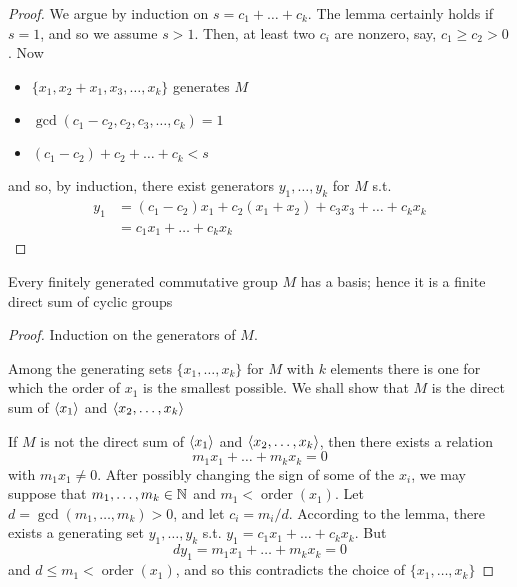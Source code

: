 \documentclass[11pt]{article}
\DeclareMathOperator{\order}{order}
\begin{document}
\begin{proof}
We argue by induction on \(s=c_1+\dots+c_k\). The lemma certainly holds if \(s=1\), and so we
assume \(s>1\). Then, at least two \(c_i\) are nonzero, say, \(c_1\ge c_2>0\). Now
\begin{itemize}
\item \(\{x_1,x_2+x_1,x_3,\dots,x_k\}\) generates \(M\)
\item \(\gcd(c_1-c_2,c_2,c_3,\dots,c_k)=1\)
\item \((c_1-c_2)+c_2+\dots+c_k<s\)
\end{itemize}


and so, by induction, there exist generators \(y_1,\dots,y_k\) for \(M\) s.t.
\begin{align*}
y_1&=(c_1-c_2)x_1+c_2(x_1+x_2)+c_3x_3+\dots+c_kx_k\\
&=c_1x_1+\dots+c_kx_k
\end{align*}
\end{proof}

\begin{theorem}[]
\label{1.54}
Every finitely generated commutative group \(M\) has a basis; hence it is a finite direct sum of
cyclic groups
\end{theorem}

\begin{proof}
Induction on the generators of \(M\).

Among the generating sets \(\{x_1,\dots,x_k\}\) for \(M\) with \(k\) elements there is one for which
the order of \(x_1\) is the smallest possible. We shall show that \(M\) is the direct sum
of \(\langle x_1\rangle\) and \(\langle x_2,\dots,x_k\rangle\)

If \(M\) is not the direct sum of \(\langle x_1\rangle\) and \(\langle x_2,\dots,x_k\rangle\), then there exists a relation
\begin{equation*}
m_1x_1+\dots+m_kx_k=0
\end{equation*}
with \(m_1x_1\neq 0\). After possibly changing the sign of some of the \(x_i\), we may suppose
that \(m_1,\dots,m_k\in\mathbb{N}\) and \(m_1<\order(x_1)\). Let \(d=\gcd(m_1,\dots,m_k)>0\), and let \(c_i=m_i/d\).
According to the lemma, there exists a generating set \(y_1,\dots,y_k\) s.t. \(y_1=c_1x_1+\dots+c_kx_k\).
But
\begin{equation*}
dy_1=m_1x_1+\dots+m_kx_k=0
\end{equation*}
and \(d\le m_1<\order(x_1)\), and so this contradicts the choice of \(\{x_1,\dots,x_k\}\)
\end{proof}
\end{document}
